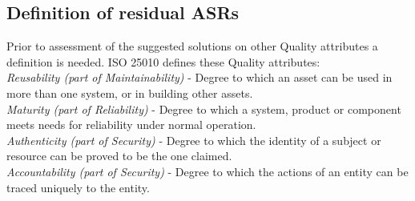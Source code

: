 \subsection{Definition of residual ASRs}
Prior to assessment of the suggested solutions on other Quality attributes a definition is needed. ISO 25010 \cite{ISO:25010:2011} defines these Quality attributes: \\
\textit{Reusability (part of Maintainability)} - Degree to which an asset can be used in more than one system, or in building other assets. \\
\textit{Maturity (part of Reliability)} - Degree to which a system, product or component meets needs for reliability under normal operation. \\
\textit{Authenticity (part of Security)} - Degree to which the identity of a subject or resource can be proved to be the one claimed. \\
\textit{Accountability (part of Security)} - Degree to which the actions of an entity can be traced uniquely to the entity. \\

